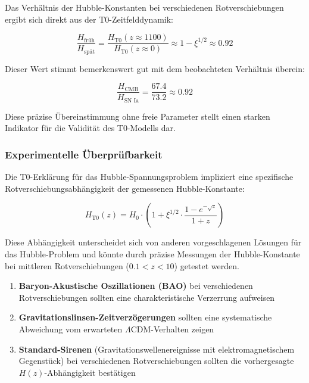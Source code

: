 \documentclass[12pt,a4paper]{article}
\theoremstyle{definition}
\begin{document}
\begin{verhaltnis}
	Das Verhältnis der Hubble-Konstanten bei verschiedenen Rotverschiebungen ergibt sich direkt aus der T0-Zeitfelddynamik:
	
	\begin{equation}
		\frac{H_{\text{früh}}}{H_{\text{spät}}} = \frac{H_{\text{T0}}(z \approx 1100)}{H_{\text{T0}}(z \approx 0)} \approx 1 - \xi^{1/2} \approx 0.92
	\end{equation}
	
	Dieser Wert stimmt bemerkenswert gut mit dem beobachteten Verhältnis überein:
	
	\begin{equation}
		\frac{H_{\text{CMB}}}{H_{\text{SN Ia}}} = \frac{67.4}{73.2} \approx 0.92
	\end{equation}
	
	Diese präzise Übereinstimmung ohne freie Parameter stellt einen starken Indikator für die Validität des T0-Modells dar.
\end{verhaltnis}

\subsubsection{Experimentelle Überprüfbarkeit}

Die T0-Erklärung für das Hubble-Spannungsproblem impliziert eine spezifische Rotverschiebungsabhängigkeit der gemessenen Hubble-Konstante:

\begin{equation}
	H_{\text{T0}}(z) = H_0 \cdot \left(1 + \xi^{1/2} \cdot \frac{1 - e^{-\sqrt{z}}}{1 + z}\right)
\end{equation}

Diese Abhängigkeit unterscheidet sich von anderen vorgeschlagenen Lösungen für das Hubble-Problem und könnte durch präzise Messungen der Hubble-Konstante bei mittleren Rotverschiebungen ($0.1 < z < 10$) getestet werden.

\begin{enumerate}
	\item \textbf{Baryon-Akustische Oszillationen (BAO)} bei verschiedenen Rotverschiebungen sollten eine charakteristische Verzerrung aufweisen
	
	\item \textbf{Gravitationslinsen-Zeitverzögerungen} sollten eine systematische Abweichung vom erwarteten $\Lambda$CDM-Verhalten zeigen
	
	\item \textbf{Standard-Sirenen} (Gravitationswellenereignisse mit elektromagnetischem Gegenstück) bei verschiedenen Rotverschiebungen sollten die vorhergesagte $H(z)$-Abhängigkeit bestätigen
\end{enumerate}
\end{document}
